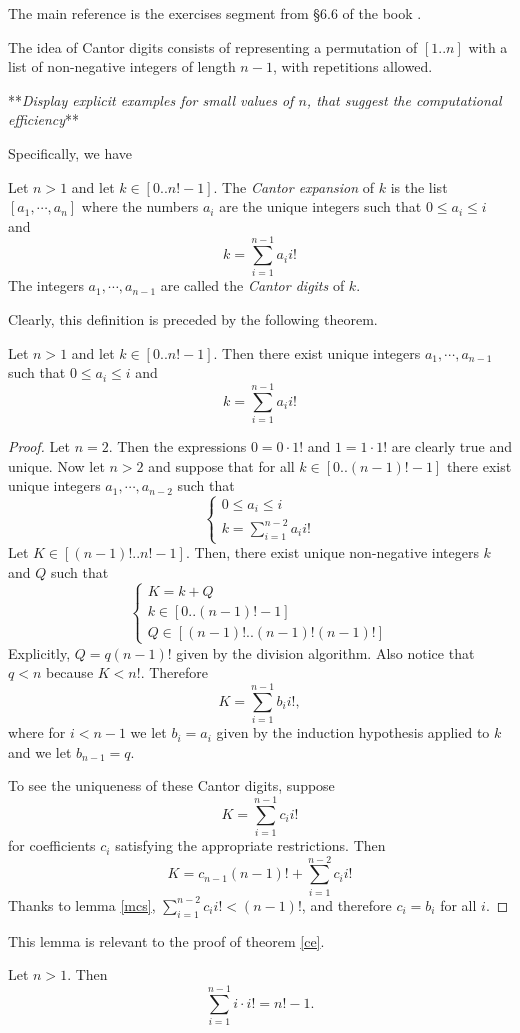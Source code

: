 The main reference is the exercises segment from \S 6.6 of the book \cite{rosen7thEd}.

The idea of Cantor digits consists of representing a permutation of $[1..n]$ with
a list of non-negative integers of length $n-1$, with repetitions allowed.

\bigskip
**\emph{Display explicit examples for small values of $n$, that suggest the
computational efficiency}**

\bigskip
Specifically, we have

\begin{defn}
	Let $n > 1$ and let $k \in [0..n!-1]$. The \emph{Cantor expansion} of
	$k$ is the list $[a_1, \cdots, a_n]$ where the numbers $a_i$ are the unique
	integers such that $0 \leq a_i \leq i$ and
	\[
		k = \sum_{i= 1}^{n-1} a_ii!
	\]
	The integers $a_1,\cdots,a_{n-1}$ are called the \emph{Cantor digits} of
	$k$.
\end{defn}

Clearly, this definition is preceded by the following theorem.

\begin{thm}\label{ce} %
	Let $n > 1$ and let $k \in [0..n!-1]$. Then there exist unique integers
	$a_1,\cdots,a_{n-1}$ such that $0 \leq a_i \leq i$ and
	\[
		k = \sum_{i= 1}^{n-1} a_ii!
	\]
\end{thm}
%
\begin{proof}
	Let $n= 2$. Then the expressions $0 = 0\cdot1!$ and $1 = 1\cdot1!$ are
	clearly true and unique.
	Now let $n > 2$ and suppose that for all $k \in [0..(n-1)!-1]$ there exist
	unique integers $a_1,\cdots,a_{n-2}$ such that
	\[
		\begin{cases}
			0 \leq a_i \leq i\\
			k = \sum_{i= 1}^{n-2} a_ii! 
		\end{cases}
	\]
	Let $K \in [(n-1)!..n!-1]$. Then, there exist unique non-negative integers
	$k$ and $Q$ such that
	\[
		\begin{cases}
			K = k + Q\\
			k \in [0..(n-1)!-1]\\
			Q \in [(n-1)!..(n-1)!(n-1)!]
		\end{cases}
	\]
	Explicitly, $Q = q(n-1)!$ given by the division algorithm. Also notice
	that $q < n$ because $K < n!$.
	Therefore
	\[
		K = \sum_{i= 1}^{n-1}b_ii!,
	\]
	where for $i < n-1$ we let $b_i= a_i$ given by the induction hypothesis
	applied to $k$ and we let $b_{n-1}= q$.

	To see the uniqueness of these Cantor digits, suppose
	\[
		K = \sum_{i= 1}^{n-1} c_ii!
	\]
	for coefficients $c_i$ satisfying the appropriate restrictions. Then
	\[
		K = c_{n-1}(n-1)! + \sum_{i=1}^{n-2} c_ii!
	\]
	Thanks to lemma \ref{mcs}, $\sum_{i= 1}^{n-2} c_ii! < (n-1)!$, and therefore
	$c_i = b_i$ for all $i$.
\end{proof}

This lemma is relevant to the proof of theorem \ref{ce}.
\begin{lma}\label{mcs} %
	Let $n > 1$. Then
	\[
		\sum_{i= 1}^{n-1} i\cdot i! = n!-1.
	\]
\end{lma}
